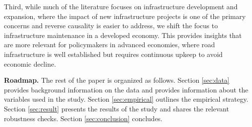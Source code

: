Third, while much of the literature focuses on infrastructure development and expansion, where the impact of new infrastructure projects is one of the primary concerns and reverse causality is easier to address, we shift the focus to infrastructure maintenance in a developed economy. This provides insights that are more relevant for policymakers in advanced economies, where road infrastructure is well established but requires continuous upkeep to avoid economic decline.

{\bf Roadmap.} The rest of the paper is organized as follows. Section \ref{sec:data} provides background information on the data and provides information about the variables used in the study. Section \ref{sec:empirical} outlines the empirical strategy. Section \ref{sec:result} presents the results of the study and shares the relevant robustness checks. Section \ref{sec:conclusion} concludes.